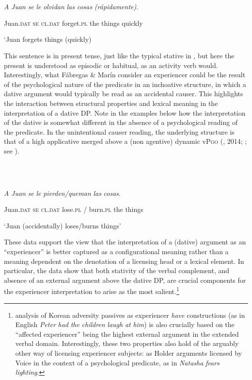 \documentclass[output=paper,modfonts,nonflat]{langsci/langscibook}
\begin{document}
\ea%
    \label{ex:key:21}
    \gll\\
        \\
    \glt
    \z

           \textit{A} \textit{Juan} \textit{se} \textit{le} \textit{olvidan} \textit{las} \textit{cosas} \textit{(rápidamente)}.

  Juan.\textsc{dat} \textsc{se} \textsc{cl.dat} forget.\textsc{pl} the things quickly

  ‘Juan forgets things (quickly)

This sentence is in present tense, just like the typical stative in , but here the present is understood as episodic or habitual, as an activity verb would. Interestingly, what Fábregas \& Marín consider an experiencer could be the result of the psychological nature of the predicate in an inchoative structure, in which a dative argument would typically be read as an accidental causer. This highlights the interaction between structural properties and lexical meaning in the interpretation of a dative DP. Note in the examples below how the interpretation of the dative is somewhat different in the absence of a psychological reading of the predicate. In the unintentional causer reading, the underlying structure is that of a high applicative merged above a (non agentive) dynamic vP\textsc{go} (\citealt{Cuervo2003}, 2014; \citealt{Schäfer2008}; see ).

\ea%
    \label{ex:key:22}
    \gll\\
        \\
    \glt
    \z

           \textit{A} \textit{Juan} \textit{se} \textit{le} \textit{pierden/queman} \textit{las} \textit{cosas}. 

  Juan.\textsc{dat} \textsc{se} \textsc{cl.dat}   lose.\textsc{pl} / burn.\textsc{pl}  the things

  ‘Juan (accidentally) loses/burns things’ 

These data support the view that the interpretation of a (dative) argument as an “experiencer” is better captured as a configurational meaning rather than a meaning dependent on the denotation of a licensing head or a lexical element. In particular, the data show that both stativity of the verbal complement, and absence of an external argument above the dative DP, are crucial components for the experiencer interpretation to arise as the most salient.\footnote{ analysis of Korean adversity passives as experiencer \textit{have} constructions (as in English \textit{Peter} \textit{had} \textit{the} \textit{children} \textit{laugh} \textit{at} \textit{him}) is also crucially based on the “affected experiencer” being the highest external argument in the extended verbal domain. Interestingly, these two properties also hold of the arguably other way of licensing experiencer subjects: as Holder arguments licensed by Voice in the context of a psychological predicate, as in \textit{Natasha} \textit{fears} \textit{lighting}.} 
\end{document}
